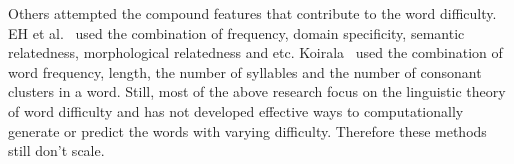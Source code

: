 Others attempted the compound features that contribute to 
the word difficulty. EH et al.~ used the 
combination of frequency, domain specificity, semantic relatedness, 
morphological relatedness and etc. Koirala~ 
used  the combination of word frequency, length, the number of syllables 
and the number of consonant clusters in a word.
Still, most of the above research focus on the linguistic theory of
word difficulty and has not developed 
effective ways to computationally generate or predict the 
words with varying difficulty.
Therefore these methods still don't scale. 

